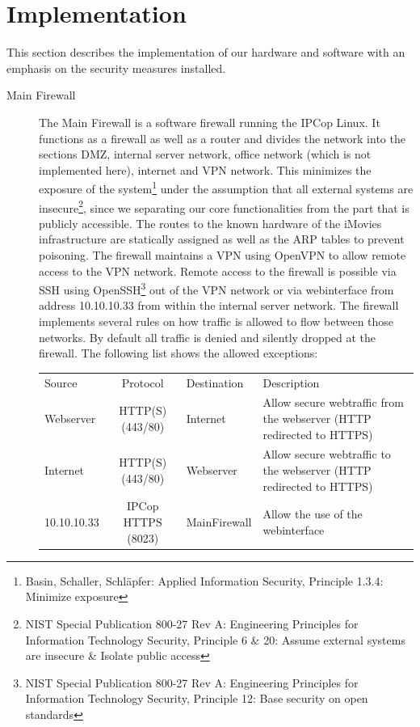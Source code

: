 \documentclass[a4paper, toc=index, 12pt, DIV14, twoside, BCOR2cm, headsepline, numbers=noenddot, bibliography=totoc]{report}
\begin{document}
\section{Implementation}
This section describes the implementation of our hardware and software with an emphasis on the security measures installed.
\begin{description}
\item[Main Firewall ] The Main Firewall is a software firewall running the IPCop Linux. It functions as a firewall as well as a router and divides the network into the sections DMZ, internal server network, office network (which is not implemented here), internet and VPN network. This minimizes the exposure of the system\footnote{Basin, Schaller, Schläpfer: Applied Information Security, Principle 1.3.4: Minimize exposure}
 under the assumption that all external systems are insecure\footnote{NIST Special Publication 800-27 Rev A: Engineering Principles for Information Technology Security, Principle 6 \& 20: Assume external systems are insecure \& Isolate public access}, since we separating our core functionalities from the part that is publicly accessible. The routes to the known hardware of the iMovies infrastructure are statically assigned as well as the ARP tables to prevent poisoning. The firewall maintains a VPN using OpenVPN to allow remote access to the VPN network. Remote access to the firewall is possible via SSH using OpenSSH\footnote{NIST Special Publication 800-27 Rev A: Engineering Principles for Information Technology Security, Principle 12: Base security on open standards} out of the VPN network or via webinterface from address 10.10.10.33 from within the internal server network. \newline
The firewall implements several rules on how traffic is allowed to flow between those networks. By default all traffic is denied and silently dropped at the firewall. The following list shows the allowed exceptions: \newline
\begin{tabular}{p{2.5cm} c l p{4cm}}
Source & Protocol & Destination & Description\\
\cline{1-4}
Webserver & HTTP(S) (443/80) & Internet & Allow secure webtraffic from the webserver (HTTP redirected to HTTPS)\\
\cline{1-4}
Internet & HTTP(S) (443/80) & Webserver & Allow secure webtraffic to the webserver (HTTP redirected to HTTPS)\\
\cline{1-4}
10.10.10.33 & IPCop HTTPS (8023) & MainFirewall & Allow the use of the webinterface\\

\end{tabular}
\end{description}
\end{document}
